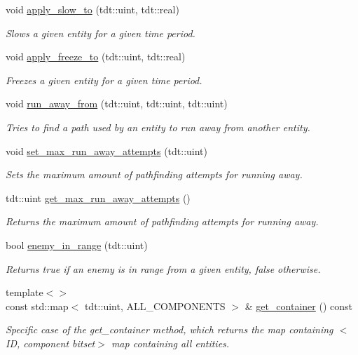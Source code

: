 \begin{DoxyCompactItemize}
void \hyperlink{class_combat_system_a99deeb9898f08379e2ff0e1471428a1f}{apply\+\_\+slow\+\_\+to} (tdt\+::uint, tdt\+::real)
\begin{DoxyCompactList}\small\item\em Slows a given entity for a given time period. \end{DoxyCompactList}\item 
void \hyperlink{class_combat_system_a67c67143f6d96a5f0947627b7c355dfe}{apply\+\_\+freeze\+\_\+to} (tdt\+::uint, tdt\+::real)
\begin{DoxyCompactList}\small\item\em Freezes a given entity for a given time period. \end{DoxyCompactList}\item 
void \hyperlink{class_combat_system_aa1dcd9b7fa26a536bfee3cb7a2b90d3a}{run\+\_\+away\+\_\+from} (tdt\+::uint, tdt\+::uint, tdt\+::uint)
\begin{DoxyCompactList}\small\item\em Tries to find a path used by an entity to run away from another entity. \end{DoxyCompactList}\item 
void \hyperlink{class_combat_system_a3345cf86852bee674fdd61b8c82001c7}{set\+\_\+max\+\_\+run\+\_\+away\+\_\+attempts} (tdt\+::uint)
\begin{DoxyCompactList}\small\item\em Sets the maximum amount of pathfinding attempts for running away. \end{DoxyCompactList}\item 
tdt\+::uint \hyperlink{class_combat_system_a6144440bbf7eeced81444326e42e6645}{get\+\_\+max\+\_\+run\+\_\+away\+\_\+attempts} ()
\begin{DoxyCompactList}\small\item\em Returns the maximum amount of pathfinding attempts for running away. \end{DoxyCompactList}\item 
bool \hyperlink{class_combat_system_a9ec58d96936e66225997d9d7df7717d0}{enemy\+\_\+in\+\_\+range} (tdt\+::uint)
\begin{DoxyCompactList}\small\item\em Returns true if an enemy is in range from a given entity, false otherwise. \end{DoxyCompactList}\item 
{\footnotesize template$<$$>$ }\\const std\+::map$<$ tdt\+::uint, A\+L\+L\+\_\+\+C\+O\+M\+P\+O\+N\+E\+N\+TS $>$ \& \hyperlink{class_combat_system_a6e001848f89439467e08c8d1fcd10e2b}{get\+\_\+container} () const 
\begin{DoxyCompactList}\small\item\em Specific case of the get\+\_\+container method, which returns the map containing $<$ID, component bitset$>$ map containing all entities. \end{DoxyCompactList}\end{DoxyCompactItemize}
